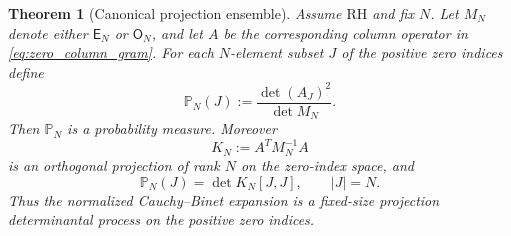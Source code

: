 \documentclass[11pt]{amsart}
\numberwithin{equation}{section}
\theoremstyle{plain}
\newtheorem{theorem}{Theorem}[section]
\theoremstyle{definition}
\theoremstyle{remark}
\newcommand{\RH}{\mathrm{RH}}
\newcommand{\E}{\mathsf E}
\newcommand{\Omat}{\mathsf O}
\begin{document}
\begin{theorem}[Canonical projection ensemble]
\label{thm:canonical_projection_ensemble}
Assume $\RH$ and fix $N$.  Let $M_N$ denote either $\E_N$ or $\Omat_N$, and let $A$ be the corresponding column operator in \eqref{eq:zero_column_gram}.  For each $N$-element subset $J$ of the positive zero indices define
\begin{equation}
\mathbb P_N(J):=
\frac{\det(A_J)^2}{\det M_N}.
\label{eq:CB_probability}
\end{equation}
Then $\mathbb P_N$ is a probability measure.  Moreover
\begin{equation}
K_N:=A^TM_N^{-1}A
\label{eq:projection_kernel_zero_indices}
\end{equation}
is an orthogonal projection of rank $N$ on the zero-index space, and
\begin{equation}
\mathbb P_N(J)=\det K_N[J,J],
\qquad |J|=N.
\label{eq:projection_DPP_formula}
\end{equation}
Thus the normalized Cauchy--Binet expansion is a fixed-size projection determinantal process on the positive zero indices.
\end{theorem}
\end{document}
